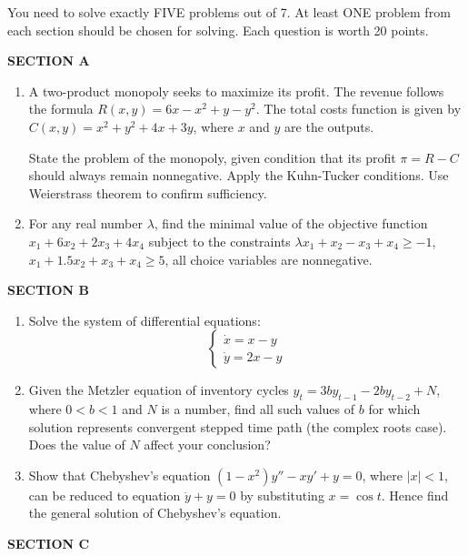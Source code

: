 \documentclass[12pt]{article} %
\theoremstyle{definition} %
\begin{document}
You need to solve exactly FIVE problems out of 7. At least ONE problem from each section should be chosen for solving. Each question is worth 20 points.

\vspace{20pt}
\textbf{SECTION A}
\vspace{20pt}

\begin{enumerate}
\item A two-product monopoly seeks to maximize its profit. The revenue  follows the formula $R(x,y)=6x-x^2+y-y^2$. The total costs function is given by $C(x,y)=x^2+y^2+4x+3y$, where $x$ and $y$ are the outputs.

State the problem of the monopoly, given condition that its profit $\pi=R-C$ should always remain nonnegative. Apply the Kuhn-Tucker conditions. Use Weierstrass theorem to confirm sufficiency.
\item For any real number $\lambda$, find the minimal value of the objective function $x_1+6x_2+2x_3+4x_4$ subject to the constraints  $\lambda x_1+x_2-x_3+x_4\geq -1$, $x_1+1.5x_2+x_3+x_4 \geq 5$,  all choice variables are nonnegative.
\end{enumerate}

\vspace{20pt}
\textbf{SECTION B}
\vspace{20pt}

\begin{enumerate}[resume]
\item Solve the system of differential equations:
\[
\begin{cases}
\dot{x}=x-y \\
\dot{y}=2x-y
\end{cases}
\]
\item Given the Metzler equation of inventory cycles $y_t=3by_{t-1}-2by_{t-2}+N$, where $0<b<1$ and $N$ is a number, find all such values of $b$ for which solution represents convergent stepped time path (the complex roots case). Does the value of $N$ affect your conclusion?
\item Show that Chebyshev’s equation $(1-x^2)y''-xy'+y=0$, where $|x|<1$, can be reduced to equation $\ddot{y}+y=0$ by substituting $x=\cos t$. Hence find the general solution of Chebyshev’s equation.
\end{enumerate}

\vspace{20pt}
\textbf{SECTION C}
\vspace{20pt}
\end{document}
